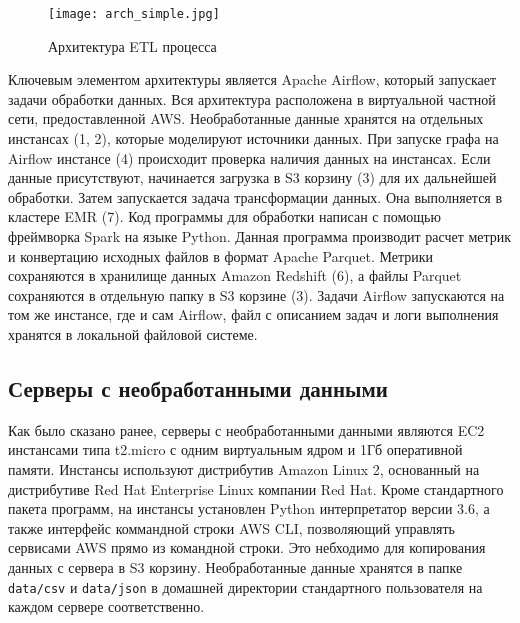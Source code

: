 \documentclass[bachelor, och, pract]{SCWorks}
\begin{document}

\begin{figure}[!ht]
	\centering
	\texttt{[image: arch\_simple.jpg]}
	\caption{\label{arch_simple}
		Архитектура ETL процесса}
\end{figure}

Ключевым элементом архитектуры является Apache Airflow, который запускает задачи обработки данных. Вся архитектура расположена в виртуальной частной сети, предоставленной AWS. Необработанные данные хранятся на отдельных инстансах (1, 2), которые моделируют источники данных. При запуске графа на Airflow инстансе (4) происходит проверка наличия данных на инстансах. Если данные присутствуют, начинается загрузка в S3 корзину (3) для их дальнейшей обработки. Затем запускается задача трансформации данных. Она выполняется в кластере EMR (7). Код программы для обработки написан с помощью фреймворка Spark на языке Python. Данная программа производит расчет метрик и конвертацию исходных файлов в формат Apache Parquet. Метрики сохраняются в хранилище данных Amazon Redshift (6), а файлы Parquet сохраняются в отдельную папку в S3 корзине (3).
Задачи Airflow запускаются на том же инстансе, где и сам Airflow, файл с описанием задач и логи выполнения хранятся в локальной файловой системе.

\subsection{Серверы с необработанными данными}
Как было сказано ранее, серверы с необработанными данными являются EC2 инстансами типа t2.micro с  одним виртуальным ядром и 1Гб оперативной памяти. Инстансы используют дистрибутив Amazon Linux 2, основанный на дистрибутиве Red Hat Enterprise Linux компании Red Hat. Кроме стандартного пакета программ, на инстансы установлен Python интерпретатор версии 3.6, а также интерфейс коммандной строки AWS CLI, позволяющий управлять сервисами AWS прямо из командной строки. Это небходимо для копирования данных с сервера в S3 корзину. Необработанные данные хранятся в папке \verb|data/csv| и \verb|data/json| в домашней директории стандартного пользователя на каждом сервере соответственно.
\end{document}
